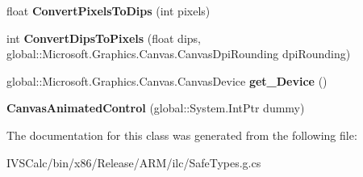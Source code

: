 \begin{DoxyCompactItemize}
float {\bfseries Convert\+Pixels\+To\+Dips} (int pixels)
\item 
\mbox{\label{class_microsoft_1_1_graphics_1_1_canvas_1_1_u_i_1_1_xaml_1_1_canvas_animated_control_aa34dd27c9c4151d704bfb1983c806c32}} 
int {\bfseries Convert\+Dips\+To\+Pixels} (float dips, global\+::\+Microsoft.\+Graphics.\+Canvas.\+Canvas\+Dpi\+Rounding dpi\+Rounding)
\item 
\mbox{\label{class_microsoft_1_1_graphics_1_1_canvas_1_1_u_i_1_1_xaml_1_1_canvas_animated_control_aec535e07f21ffa8f46615d610ebefa92}} 
global\+::\+Microsoft.\+Graphics.\+Canvas.\+Canvas\+Device {\bfseries get\+\_\+\+Device} ()
\item 
\mbox{\label{class_microsoft_1_1_graphics_1_1_canvas_1_1_u_i_1_1_xaml_1_1_canvas_animated_control_a8981d0bd18a97c22dbdf7422dc124959}} 
{\bfseries Canvas\+Animated\+Control} (global\+::\+System.\+Int\+Ptr dummy)
\end{DoxyCompactItemize}


The documentation for this class was generated from the following file\+:\begin{DoxyCompactItemize}
\item 
I\+V\+S\+Calc/bin/x86/\+Release/\+A\+R\+M/ilc/Safe\+Types.\+g.\+cs\end{DoxyCompactItemize}
